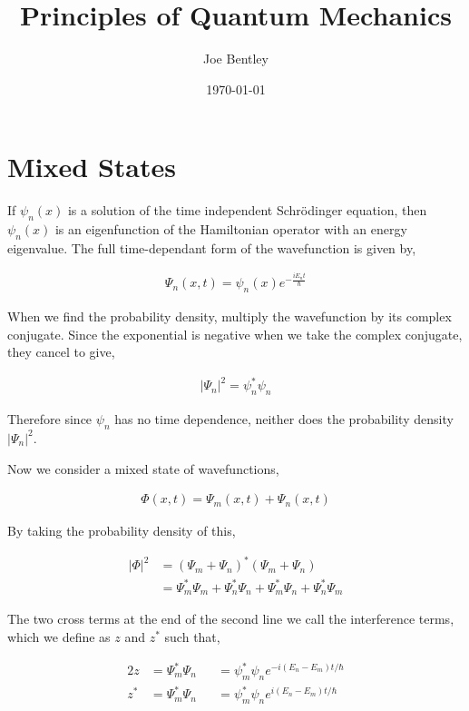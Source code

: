 \documentclass[11pt]{amsart}
\title{Principles of Quantum Mechanics}
\author{Joe Bentley}
\date{\today}
\begin{document}
\maketitle

\newpage

\section{Mixed States}

If $\psi_n(x)$ is a solution of the time independent Schr\"{o}dinger equation, then $\psi_n(x)$ is an eigenfunction of the Hamiltonian operator with an energy eigenvalue. The full time-dependant form of the wavefunction is given by,

\begin{align*}
  \Psi_n(x, t) = \psi_n(x) e^{-\frac{iE_nt}{\hbar}}
\end{align*}

When we find the probability density, multiply the wavefunction by its complex conjugate. Since the exponential is negative when we take the complex conjugate, they cancel to give,

\begin{align*}
  {|\Psi_n|}^2 = \psi^*_n\psi_n
\end{align*}

Therefore since $\psi_n$ has no time dependence, neither does the probability density ${|\Psi_n|}^2$.

Now we consider a mixed state of wavefunctions,

\begin{align*}
  \Phi(x, t) = \Psi_m(x, t) + \Psi_n(x, t)
\end{align*}

By taking the probability density of this,

\begin{align*}
  {|\Phi|}^2 &= {(\Psi_m + \Psi_n)}^* (\Psi_m + \Psi_n) \\
               &= \Psi_m^* \Psi_m + \Psi_n^* \Psi_n + \Psi_m^* \Psi_n + \Psi_n^* \Psi_m
\end{align*}

The two cross terms at the end of the second line we call the interference terms, which we define as $z$ and $z^*$ such that,

\begin{alignat*}{2}
  z &= \Psi^*_m \Psi_n &&= \psi_m^* \psi_n e^{-i(E_n - E_m)t / \hbar} \\
  z^* &= \Psi^*_m \Psi_n &&= \psi_m^* \psi_n e^{i(E_n - E_m)t / \hbar}
\end{alignat*}
\end{document}
